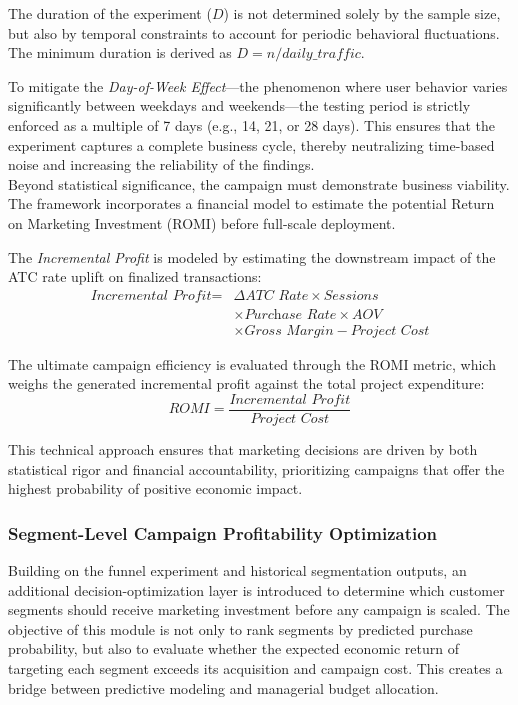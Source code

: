 \documentclass[conference]{IEEEtran}
\begin{document}
The duration of the experiment ($D$) is not determined solely by the sample size, but also by temporal constraints to account for periodic behavioral fluctuations. The minimum duration is derived as $D = n / \textit{daily\_traffic}$. 

To mitigate the \textit{Day-of-Week Effect}—the phenomenon where user behavior varies significantly between weekdays and weekends—the testing period is strictly enforced as a multiple of 7 days (e.g., 14, 21, or 28 days). This ensures that the experiment captures a complete business cycle, thereby neutralizing time-based noise and increasing the reliability of the findings. \\
Beyond statistical significance, the campaign must demonstrate business viability. The framework incorporates a financial model to estimate the potential Return on Marketing Investment (ROMI) before full-scale deployment.

The \textit{Incremental Profit} is modeled by estimating the downstream impact of the ATC rate uplift on finalized transactions:
\begin{equation}
\begin{aligned}
\textit{Incremental Profit} ={}& \Delta \textit{ATC Rate} \times \textit{Sessions} \\
& \times \textit{Purchase Rate} \times \textit{AOV} \\
& \times \textit{Gross Margin} - \textit{Project Cost}
\end{aligned}
\end{equation}

The ultimate campaign efficiency is evaluated through the ROMI metric, which weighs the generated incremental profit against the total project expenditure:
\begin{equation}
\textit{ROMI} = \frac{\textit{Incremental Profit}}{\textit{Project Cost}}
\end{equation}

This technical approach ensures that marketing decisions are driven by both statistical rigor and financial accountability, prioritizing campaigns that offer the highest probability of positive economic impact.

\subsubsection{Segment-Level Campaign Profitability Optimization}

Building on the funnel experiment and historical segmentation outputs, an additional decision-optimization layer is introduced to determine which customer segments should receive marketing investment before any campaign is scaled. The objective of this module is not only to rank segments by predicted purchase probability, but also to evaluate whether the expected economic return of targeting each segment exceeds its acquisition and campaign cost. This creates a bridge between predictive modeling and managerial budget allocation.
\end{document}
